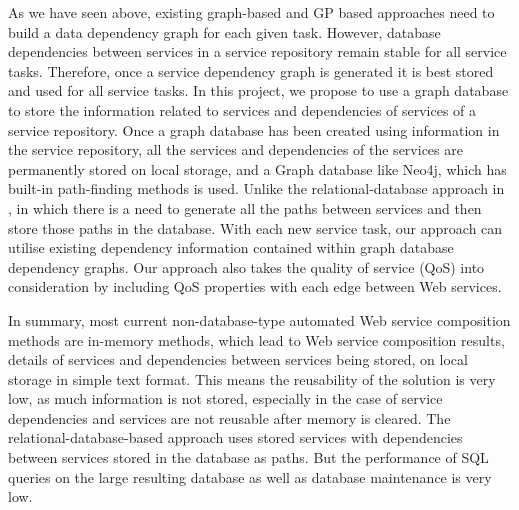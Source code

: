 As we have seen above, existing graph-based \cite{5} and GP based \cite{2} approaches need to build a data dependency graph for each given task. However, database dependencies between services in a service repository remain stable for all service tasks. Therefore, once a service dependency graph is generated it is best stored and used for all service tasks. In this project, we propose to use a graph database to store the information related to services and dependencies of services of a service repository. Once a graph database has been created using information in the service repository, all the services and dependencies of the services are permanently stored on local storage, and a Graph database like Neo4j, which has built-in path-finding methods is used. Unlike the relational-database approach in \cite{26},  in which there is a need to generate all the paths between services and then store those paths in the database. With each new service task, our approach can utilise existing dependency information contained within graph database dependency graphs. Our approach also takes the quality of service (QoS) into consideration by including QoS properties with each edge between Web services.\par   
 
In summary, most current non-database-type automated Web service composition methods \cite{2,5} are in-memory methods, which lead to Web service composition results, details of services and dependencies between services being stored, on local storage in simple text format. This means the reusability of the solution is very low, as much information is not stored, especially in the case of service dependencies and services are not reusable after memory is cleared. The relational-database-based approach \cite{26} uses stored services with dependencies between services stored in the database as paths. But the performance of SQL queries on the large resulting database as well as database maintenance is very low.\par